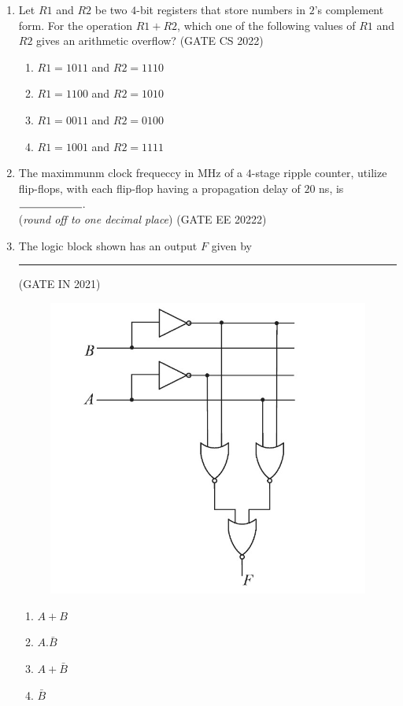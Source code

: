 \begin{enumerate}
	\item Let $R1$ and $R2$ be two $4$-bit registers that store numbers in $2$’s complement form.
	      For the operation $R1+R2$, which one of the following values of $R1$ and $R2$ gives an
	      arithmetic overflow?
	      \hfill{(GATE CS 2022)}

	      \begin{enumerate}
		      \item $R1 = 1011$ and $R2 = 1110$
		      \item $R1 = 1100$ and $R2 = 1010$
		      \item $R1 = 0011$ and $R2 = 0100$
		      \item $R1 = 1001$ and $R2 = 1111$
	      \end{enumerate}


	\item The maximmunm clock frequeccy in MHz of a $4$-stage ripple counter, utilize flip-flops, with each flip-flop having a propagation delay of $20$ ns, is $\rule{2cm}{0.15mm}$.\\
	      (\textit{round off to one decimal place})
	      \hfill{(GATE EE 20222)}

	\item The logic block shown has an output $F$ given by \rule{2cm}{0.15mm}
	      \hfill{(GATE IN 2021)}
	      \begin{figure}[H]
		      \centering
		      \includegraphics[width=\columnwidth]{figs/gatemage.jpg}
	      \end{figure}
	      \begin{enumerate}
		      \item$A+B$
		      \item$A.\bar{B}$
		      \item$A+\bar{B}$
		      \item$\bar{B}$
	      \end{enumerate}


\end{enumerate}

